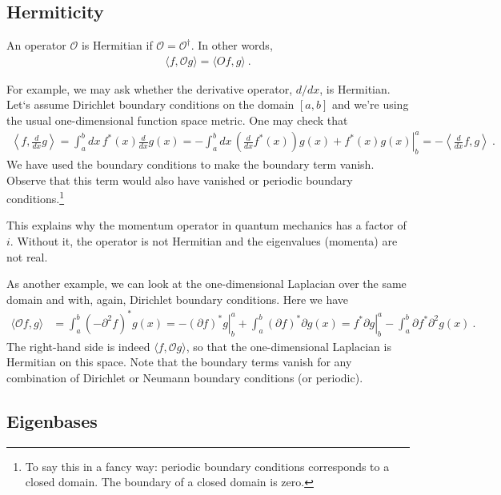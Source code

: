 \documentclass[12pt]{article}
\numberwithin{equation}{section}    %
\begin{document}
\subsection{Hermiticity}

An operator $\mathcal O$ is Hermitian if $\mathcal O = \mathcal O^\dag$. In other words,
\begin{align}
  \langle f, \mathcal O g\rangle = \langle O f, g \rangle \ .
\end{align}


For example, we may ask whether the derivative operator, $d/dx$, is Hermitian. Let‘s assume Dirichlet boundary conditions on the domain $[a,b]$ and we’re using the usual one-dimensional function space metric. One may check that
\begin{align}
  \left\langle f, \frac{d}{dx}g\right\rangle 
  = 
  \int_a^b dx \, f^*(x) \frac{d}{dx} g(x)
  = 
  - \int_a^b dx \, \left(\frac{d}{dx}f^*(x)\right)  g(x)
  + \left.f^*(x)g(x)\right|^a_b
  = -\left\langle \frac{d}{dx} f, g\right\rangle \ .
\end{align}
We have used the boundary conditions to make the boundary term vanish. Observe that this term would also have vanished or periodic boundary conditions.\footnote{To say this in a fancy way: periodic boundary conditions corresponds to a closed domain. The boundary of a closed domain is zero.}

This explains why the momentum operator in quantum mechanics has a factor of $i$. Without it, the operator is not Hermitian and the eigenvalues (momenta) are not real. 

As another example, we can look at the one-dimensional Laplacian over the same domain and with, again, Dirichlet boundary conditions. Here we have
\begin{align}
  \langle \mathcal O f,  g \rangle
  &= 
  \int_a^b \left(-\partial^2 f\right)^* g(x)
  =
  -\left.\left(\partial f\right)^* g\right|^a_b 
  +\int_a^b \left(\partial f\right)^* \partial g(x)
  =
  \left.f^* \partial g\right|^a_b 
  - \int_a^b \partial f^* \partial^2g(x) \ .
\end{align}
The right-hand side is indeed $\langle f, \mathcal O g \rangle$, so that the one-dimensional Laplacian is Hermitian on this space. Note that the boundary terms vanish for any combination of Dirichlet or Neumann boundary conditions (or periodic).

\subsection{Eigenbases}
\end{document}
